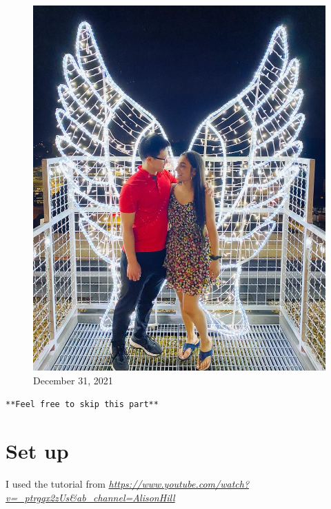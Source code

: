 \documentclass[
]{book}
\begin{document}
\begin{figure}
\centering
\includegraphics[width=5.20833in,height=\textheight]{mimages/15.1 12-31-2021.jpg}
\caption{December 31, 2021}
\end{figure}

\texttt{**Feel\ free\ to\ skip\ this\ part**}

\hypertarget{set-up}{%
\section{Set up}\label{set-up}}

I used the tutorial from \emph{\url{https://www.youtube.com/watch?v=_ptrgqx2zUs\&ab_channel=AlisonHill}}
\end{document}
